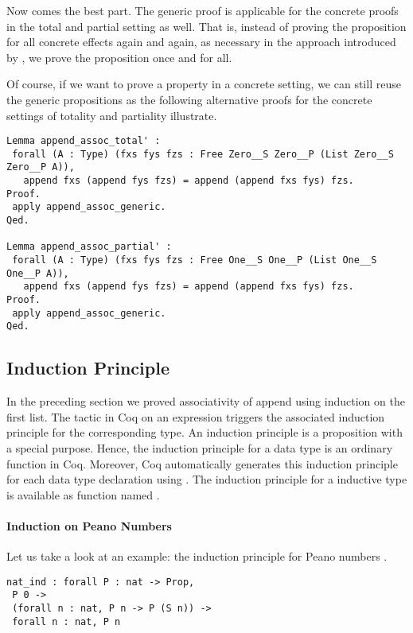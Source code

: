 Now comes the best part.
The generic proof is applicable for the concrete proofs in the total
and partial setting as well.
That is, instead of proving the proposition for all concrete effects
again and again, as necessary in the approach introduced by
\citet{abel2005verifying}, we prove the proposition once and for all.

Of course, if we want to prove a property in a concrete setting, we
can still reuse the generic propositions as the following alternative
proofs for the concrete settings of totality and partiality
illustrate.

\begin{verbatim}
Lemma append_assoc_total' :
 forall (A : Type) (fxs fys fzs : Free Zero__S Zero__P (List Zero__S Zero__P A)),
   append fxs (append fys fzs) = append (append fxs fys) fzs.
Proof.
 apply append_assoc_generic.
Qed.

Lemma append_assoc_partial' :
 forall (A : Type) (fxs fys fzs : Free One__S One__P (List One__S One__P A)),
   append fxs (append fys fzs) = append (append fxs fys) fzs.
Proof.
 apply append_assoc_generic.
Qed.
\end{verbatim}

\subsection{Induction Principle}

In the preceding section we proved associativity of append using
induction on the first list.
The  tactic in Coq on an expression triggers the
associated induction principle for the corresponding type.
An induction principle is a proposition with a special
purpose.
Hence, the induction principle for a data type is an ordinary function
in Coq.
Moreover, Coq automatically generates this induction principle for
each data type declaration using .
The induction principle for a inductive type  is available as
function named .

\paragraph{Induction on Peano Numbers}
Let us take a look at an example: the induction principle for Peano
numbers .

\begin{verbatim}
nat_ind : forall P : nat -> Prop,
 P 0 ->
 (forall n : nat, P n -> P (S n)) ->
 forall n : nat, P n
\end{verbatim}


